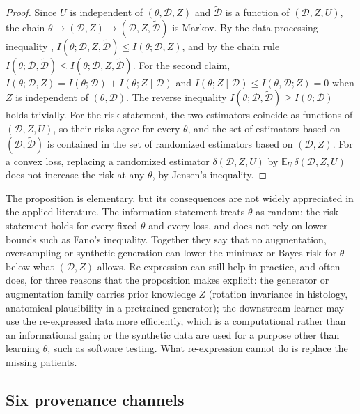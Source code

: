 \documentclass[acmsmall,screen,review]{acmart}
\theoremstyle{acmdefinition}
\begin{document}
\begin{proof}
Since $U$ is independent of $(\theta,\mathcal{D},Z)$ and $\tilde{\mathcal{D}}$ is a function of $(\mathcal{D},Z,U)$, the chain $\theta\to(\mathcal{D},Z)\to(\mathcal{D},Z,\tilde{\mathcal{D}})$ is Markov. By the data processing inequality \cite{cover2006elements}, $I(\theta;\mathcal{D},Z,\tilde{\mathcal{D}})\le I(\theta;\mathcal{D},Z)$, and by the chain rule $I(\theta;\mathcal{D},\tilde{\mathcal{D}})\le I(\theta;\mathcal{D},Z,\tilde{\mathcal{D}})$. For the second claim, $I(\theta;\mathcal{D},Z)=I(\theta;\mathcal{D})+I(\theta;Z\mid\mathcal{D})$ and $I(\theta;Z\mid\mathcal{D})\le I(\theta,\mathcal{D};Z)=0$ when $Z$ is independent of $(\theta,\mathcal{D})$. The reverse inequality $I(\theta;\mathcal{D},\tilde{\mathcal{D}})\ge I(\theta;\mathcal{D})$ holds trivially. For the risk statement, the two estimators coincide as functions of $(\mathcal{D},Z,U)$, so their risks agree for every $\theta$, and the set of estimators based on $(\mathcal{D},\tilde{\mathcal{D}})$ is contained in the set of randomized estimators based on $(\mathcal{D},Z)$. For a convex loss, replacing a randomized estimator $\delta(\mathcal{D},Z,U)$ by $\mathbb{E}_U\,\delta(\mathcal{D},Z,U)$ does not increase the risk at any $\theta$, by Jensen's inequality.
\end{proof}

The proposition is elementary, but its consequences are not widely appreciated in the applied literature. The information statement treats $\theta$ as random; the risk statement holds for every fixed $\theta$ and every loss, and does not rely on lower bounds such as Fano's inequality. Together they say that no augmentation, oversampling or synthetic generation can lower the minimax or Bayes risk for $\theta$ below what $(\mathcal{D},Z)$ allows. Re-expression can still help in practice, and often does, for three reasons that the proposition makes explicit: the generator or augmentation family carries prior knowledge $Z$ (rotation invariance in histology, anatomical plausibility in a pretrained generator); the downstream learner may use the re-expressed data more efficiently, which is a computational rather than an informational gain; or the synthetic data are used for a purpose other than learning $\theta$, such as software testing. What re-expression cannot do is replace the missing patients.

\subsection{Six provenance channels}
\end{document}
